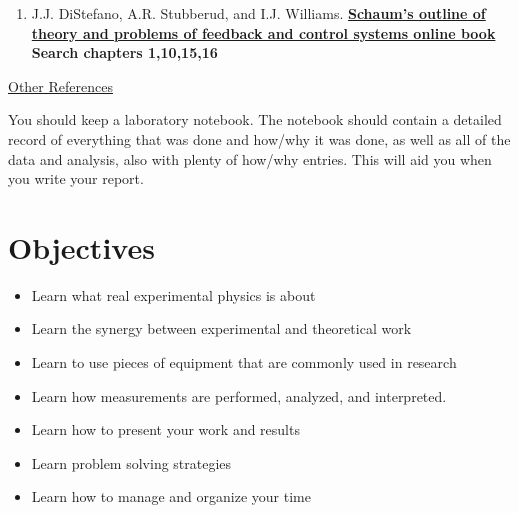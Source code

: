 \documentclass{../lab}
\begin{document}
\begin{enumerate}
    \item J.J. DiStefano, A.R. Stubberud, and I.J. Williams. \href{https://search.library.berkeley.edu/permalink/01UCS_BER/s4lks2/cdi_nii_cinii_1130000794218826112}{\textbf{Schaum’s outline of theory and problems of feedback and control systems online book}} \textbf{Search chapters 1,10,15,16}

\end{enumerate}


\hyperref[sec:References]{Other References}

You should keep a laboratory notebook. The notebook should contain a detailed record of everything that was done and how/why it was done, as well as all of the data and analysis, also with plenty of how/why entries. This will aid you when you write your report.

\section{Objectives}

\begin{itemize}
    \item Learn what real experimental physics is about

    \item Learn the synergy between experimental and theoretical work

    \item Learn to use pieces of equipment that are commonly used in research

    \item Learn how measurements are performed, analyzed, and interpreted.

    \item Learn how to present your work and results

    \item Learn problem solving strategies

    \item Learn how to manage and organize your time
\end{itemize}
\end{document}
